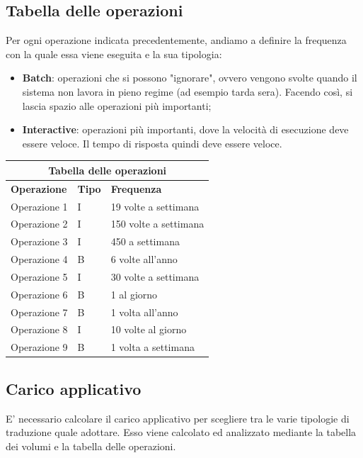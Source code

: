 \documentclass[legalpaper]{article}
\begin{document}
	\subsection{Tabella delle operazioni}
	Per ogni operazione indicata precedentemente, andiamo a definire la frequenza con la quale essa viene eseguita e la sua tipologia:
	\begin{itemize}
		\item \textbf{Batch}: operazioni che si possono "ignorare", ovvero vengono svolte quando il sistema non lavora in pieno regime (ad esempio tarda sera). Facendo così, si lascia spazio alle operazioni più importanti;
		\item \textbf{Interactive}: operazioni più importanti, dove la velocità di esecuzione deve essere veloce. Il tempo di risposta quindi deve essere veloce.
	\end{itemize}
		\renewcommand\arraystretch{2}
		\begin{tabular}{ |p{5cm}|p{2cm}|p{5cm}| }
			\hline
			\multicolumn{3}{|c|}{\textbf{Tabella delle operazioni}} \\
			\hline
			\textbf{Operazione} & \textbf{Tipo} & \textbf{Frequenza} \\
			\hline
			Operazione 1 & I &  19 volte a settimana \\ \hline
			Operazione 2 & I & 150 volte a settimana \\ \hline
			Operazione 3 & I & 450 a settimana \\ \hline
			Operazione 4 & B & 6 volte all'anno \\ \hline
			Operazione 5 & I & 30 volte a settimana \\ \hline
			Operazione 6 & B & 1 al giorno\\ \hline
			Operazione 7 & B & 1 volta all'anno \\ \hline
			Operazione 8 & I & 10 volte al giorno \\ \hline
			Operazione 9 & B & 1 volta a settimana \\ \hline
	
		
		\end{tabular}	

\subsection{Carico applicativo}
E' necessario calcolare il carico applicativo per scegliere tra le varie tipologie di traduzione quale adottare. Esso viene calcolato ed analizzato mediante la tabella dei volumi e la tabella delle operazioni.
\end{document}
